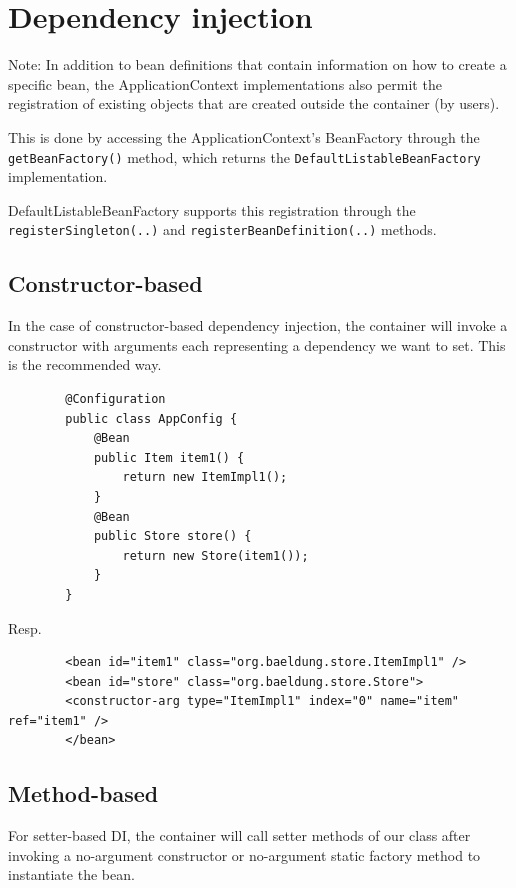 \documentclass{scrartcl}
\begin{document}
\section{Dependency injection}

Note: In addition to bean definitions that contain information on how to create a specific bean, the ApplicationContext implementations also permit the registration of existing objects that are created outside the container (by users).

This is done by accessing the ApplicationContext’s BeanFactory through the \lstinline{getBeanFactory()} method, which returns the \lstinline{DefaultListableBeanFactory} implementation.

DefaultListableBeanFactory supports this registration through the \lstinline{registerSingleton(..)} and \lstinline{registerBeanDefinition(..)} methods.

\subsection{Constructor-based}

    In the case of constructor-based dependency injection, the container will invoke a constructor with arguments each representing a dependency we want to set.
    This is the recommended way.

    \begin{lstlisting}
        @Configuration
        public class AppConfig {
            @Bean
            public Item item1() {
                return new ItemImpl1();
            }
            @Bean
            public Store store() {
                return new Store(item1());
            }
        }
    \end{lstlisting}

    Resp.

    \begin{lstlisting}
        <bean id="item1" class="org.baeldung.store.ItemImpl1" />
        <bean id="store" class="org.baeldung.store.Store">
        <constructor-arg type="ItemImpl1" index="0" name="item" ref="item1" />
        </bean>
    \end{lstlisting}

\subsection{Method-based}

    For setter-based DI, the container will call setter methods of our class after invoking a no-argument constructor or no-argument static factory method to instantiate the bean.
\end{document}
